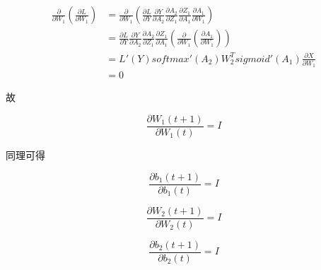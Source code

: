 \documentclass[12pt,a4paper]{amsart}
\begin{document}
\begin{equation}
	\begin{aligned}
		\frac{\partial}{\partial W_1} \left( \frac{\partial L}{\partial W_1} \right) &= \frac{\partial}{\partial W_1} \left( \frac{\partial L}{\partial Y} \frac{\partial Y}{\partial A_2} \frac{\partial A_2}{\partial Z_1} \frac{\partial Z_1}{\partial A_1} \frac{\partial A_1}{\partial W_1} \right) \\
		&= \frac{\partial L}{\partial Y} \frac{\partial Y}{\partial A_2} \frac{\partial A_2}{\partial Z_1} \frac{\partial Z_1}{\partial A_1} (\frac{\partial}{\partial W_1}(\frac{\partial A_1}{\partial W_1})) \\
		&= L'(Y) softmax'(A_2) W_2^T sigmoid'(A_1) \frac{\partial X}{\partial W_1} \\
		&= 0
	\end{aligned}
\end{equation}

故

\begin{equation}
	\frac{\partial W_1(t+1)}{\partial W_1(t)} = I
\end{equation}

同理可得

\begin{equation}
	\frac{\partial b_1(t+1)}{\partial b_1(t)} = I
\end{equation}

\begin{equation}
	\frac{\partial W_2(t+1)}{\partial W_2(t)} = I
\end{equation}

\begin{equation}
	\frac{\partial b_2(t+1)}{\partial b_2(t)} = I
\end{equation}

\end{document}
